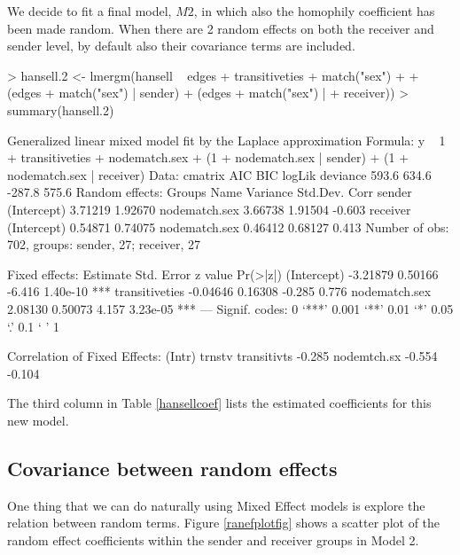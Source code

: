 \documentclass[a4paper]{article}
\begin{document}
We decide to fit a final model, $M2$, in which also the homophily coefficient has been made random. When there are 2
random effects on both the receiver and sender level, by default also their covariance terms are included.
\begin{Schunk}
\begin{Sinput}
> hansell.2 <- lmergm(hansell ~ edges + transitiveties + match("sex") + 
+     (edges + match("sex") | sender) + (edges + match("sex") | 
+     receiver))
> summary(hansell.2)
\end{Sinput}
\begin{Soutput}
Generalized linear mixed model fit by the Laplace approximation 
Formula: y ~ 1 + transitiveties + nodematch.sex + (1 + nodematch.sex |      sender) + (1 + nodematch.sex | receiver) 
   Data: cmatrix 
   AIC   BIC logLik deviance
 593.6 634.6 -287.8    575.6
Random effects:
 Groups   Name          Variance Std.Dev. Corr   
 sender   (Intercept)   3.71219  1.92670         
          nodematch.sex 3.66738  1.91504  -0.603 
 receiver (Intercept)   0.54871  0.74075         
          nodematch.sex 0.46412  0.68127  0.413  
Number of obs: 702, groups: sender, 27; receiver, 27

Fixed effects:
               Estimate Std. Error z value Pr(>|z|)    
(Intercept)    -3.21879    0.50166  -6.416 1.40e-10 ***
transitiveties -0.04646    0.16308  -0.285    0.776    
nodematch.sex   2.08130    0.50073   4.157 3.23e-05 ***
---
Signif. codes:  0 ‘***’ 0.001 ‘**’ 0.01 ‘*’ 0.05 ‘.’ 0.1 ‘ ’ 1 

Correlation of Fixed Effects:
            (Intr) trnstv
transitivts -0.285       
nodemtch.sx -0.554 -0.104
\end{Soutput}
\end{Schunk}
The third column in Table \ref{hansellcoef} lists the estimated coefficients for this new model.

\subsection{Covariance between random effects}

One thing that we can do naturally using Mixed Effect models is explore the relation between random terms. Figure \ref{ranefplotfig} shows
a scatter plot of the random effect coefficients within the sender and receiver groups in Model 2.  
\end{document}
